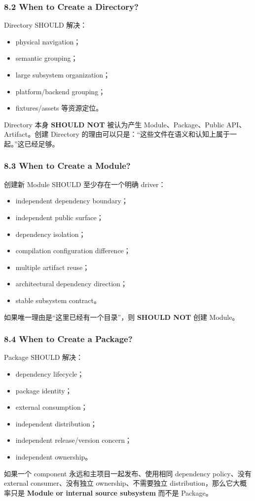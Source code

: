\documentclass[11pt,a4paper]{article}
\begin{document}
\subsubsection{8.2 When to Create a Directory?}
Directory SHOULD 解决：

\begin{itemize}
  \item physical navigation；
  \item semantic grouping；
  \item large subsystem organization；
  \item platform/backend grouping；
  \item fixtures/assets 等资源定位。
\end{itemize}
Directory 本身 \textbf{SHOULD NOT} 被认为产生 Module、Package、Public API、Artifact。创建 Directory 的理由可以只是：“这些文件在语义和认知上属于一起。”这已经足够。

\subsubsection{8.3 When to Create a Module?}
创建新 Module SHOULD 至少存在一个明确 driver：

\begin{itemize}
  \item independent dependency boundary；
  \item independent public surface；
  \item dependency isolation；
  \item compilation configuration difference；
  \item multiple artifact reuse；
  \item architectural dependency direction；
  \item stable subsystem contract。
\end{itemize}
如果唯一理由是“这里已经有一个目录”，则 \textbf{SHOULD NOT} 创建 Module。

\subsubsection{8.4 When to Create a Package?}
Package SHOULD 解决：

\begin{itemize}
  \item dependency lifecycle；
  \item package identity；
  \item external consumption；
  \item independent distribution；
  \item independent release/version concern；
  \item independent ownership。
\end{itemize}
如果一个 component 永远和主项目一起发布、使用相同 dependency policy、没有 external consumer、没有独立 ownership、不需要独立 distribution，那么它大概率只是 \textbf{Module or internal source subsystem} 而不是 Package。
\end{document}
